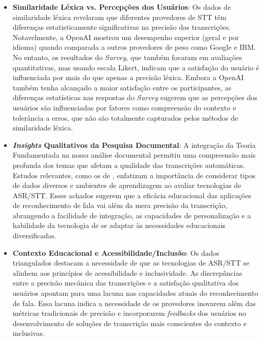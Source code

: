 \begin{itemize}

\item \textbf{Similaridade Léxica vs. Percepções dos Usuários}: Os dados de similaridade léxica revelaram que diferentes provedores de STT têm diferenças estatisticamente significativas na precisão das transcrições. Notavelmente, a OpenAI mostrou um desempenho superior (geral e por idioma) quando comparada a outros provedores de peso como Google e IBM. No entanto, os resultados do \textit{Survey}, que também focaram em avaliações quantitativas, mas usando escala Likert, indicam que a satisfação do usuário é influenciada por mais do que apenas a precisão léxica. Embora a OpenAI também tenha alcançado a maior satisfação entre os participantes, as diferenças estatísticas nas respostas do \textit{Survey} sugerem que as percepções dos usuários são influenciadas por fatores como compreensão do contexto e tolerância a erros, que não são totalmente capturados pelos métodos de similaridade léxica.

\item \textbf{\textit{Insights} Qualitativos da Pesquisa Documental}: A integração da Teoria Fundamentada \cite{Charmaz2009} na nossa análise documental permitiu uma compreensão mais profunda dos temas que afetam a qualidade das transcrições automáticas. Estudos relevantes, como os de , enfatizam a importância de considerar tipos de dados diversos e ambientes de aprendizagem ao avaliar tecnologias de ASR/STT. Esses achados sugerem que a eficácia educacional das aplicações de reconhecimento de fala vai além da mera precisão da transcrição, abrangendo a facilidade de integração, as capacidades de personalização e a habilidade da tecnologia de se adaptar às necessidades educacionais diversificadas.

\item \textbf{Contexto Educacional e Acessibilidade/Inclusão}: Os dados triangulados destacam a necessidade de que as tecnologias de ASR/STT se alinhem aos princípios de acessibilidade e inclusividade. As discrepâncias entre a precisão mecânica das transcrições e a satisfação qualitativa dos usuários apontam para uma lacuna nas capacidades atuais do reconhecimento de fala. Essa lacuna indica a necessidade de os provedores inovarem além das métricas tradicionais de precisão e incorporarem \textit{feedbacks} dos usuários no desenvolvimento de soluções de transcrição mais conscientes do contexto e inclusivas.

\end{itemize}

